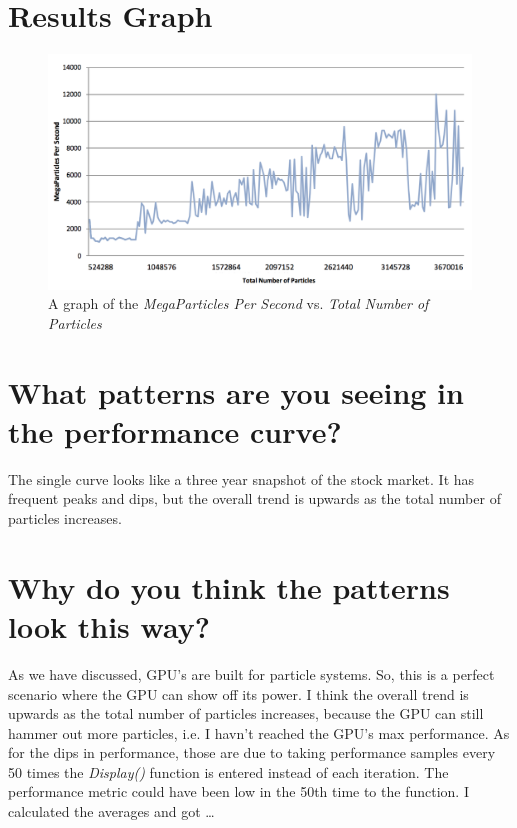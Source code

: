 \documentclass[onecolumn,draftclsnofoot, 10pt, compsoc]{IEEEtran}
\begin{document}
\section{Results Graph}
	\begin{figure}[H]
		\includegraphics[width=16cm]{graph}
		\centering
		\caption{A graph of the \textit{MegaParticles Per Second} vs. \textit{Total Number of Particles}}
	\end{figure}


				

			
	





	


\section{What patterns are you seeing in the performance curve?}
	The single curve looks like a three year snapshot of the stock market. It has frequent peaks and dips, but the overall trend is upwards as the total number of particles increases. 











\section{Why do you think the patterns look this way?}
	As we have discussed, GPU's are built for particle systems. So, this is a perfect scenario where the GPU can show off its power. I think the overall trend is upwards as the total number of particles increases, because the GPU can still hammer out more particles, i.e. I havn't reached the GPU's max performance.
	As for the dips in performance, those are due to taking performance samples every 50 times the \textit{Display()} function is entered instead of each iteration. The performance metric could have been low in the 50th time to the function. I calculated the averages  and got \dots
	
\end{document}
